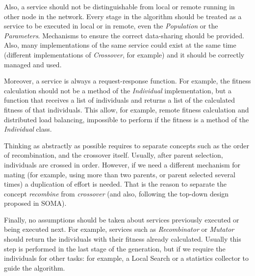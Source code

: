 Also, a service should not be distinguishable from local or remote
running in other node in the network. %
Every stage in the algorithm should be treated as a service to be
executed in local or in remote, even the {\em Population} or the {\em
  Parameters}. Mechanisms to ensure the correct data-sharing should be
provided. Also, many implementations of the same service could exist
at the same time (different implementations of {\em Crossover}, for
example) and it should be correctly managed and used. %

Moreover, a service is always a request-response function. For
example, the fitness calculation should not be a method of the {\em
  Individual} implementation, but a function that receives a list of
individuals and returns a list of the calculated fitness of that
individuals. This allow, for example, remote fitness calculation and
distributed load balancing, impossible to perform if the fitness is a
method of the {\em Individual} class. %

Thinking as abstractly as possible requires to separate concepts such as
the order of recombination, and the crossover itself. Usually, after
parent selection, individuals are crossed in order. However, if we
need a different mechanism for mating (for example, using more than
two parents, or parent selected several times) a duplication of effort
is needed. That is the reason to separate the concept {\em
  recombine} from {\em crossover} (and also, following the top-down
design proposed in SOMA).  %

Finally, no assumptions should be taken about services previously
executed or being executed next. For example, services such as {\em
  Recombinator} or {\em Mutator} should return the individuals with
their fitness already calculated. %
Usually this step is performed in
the last stage of the generation, but if we require the individuals
for other tasks: for example, a Local Search or a statistics collector
to guide the algorithm. %

